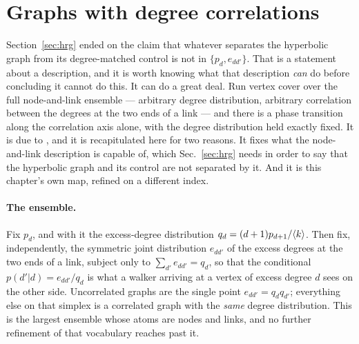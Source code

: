\section{Graphs with degree correlations}
\label{sec:vw}

Section~\ref{sec:hrg} ended on the claim that whatever separates the hyperbolic
graph from its degree-matched control is not in $\{p_{d},e_{dd'}\}$. That is a
statement about a description, and it is worth knowing what that description
\emph{can} do before concluding it cannot do this. It can do a great deal. Run
vertex cover over the full node-and-link ensemble --- arbitrary degree
distribution, arbitrary correlation between the degrees at the two ends of a
link --- and there is a phase transition along the correlation axis alone, with
the degree distribution held exactly fixed. It is due to \citet{vazquez2003vw},
and it is recapitulated here for two reasons. It fixes what the node-and-link
description is capable of, which Sec.~\ref{sec:hrg} needs in order to say that
the hyperbolic graph and its control are not separated by it. And it is this
chapter's own map, refined on a different index.

\paragraph{The ensemble.} Fix $p_{d}$, and with it the excess-degree
distribution $q_{d}=(d+1)p_{d+1}/\langle k \rangle$. Then fix, independently, the
symmetric joint distribution $e_{dd'}$ of the excess degrees at the two ends of
a link, subject only to $\sum_{d'}e_{dd'}=q_{d}$, so that the conditional
$p(d'|d)=e_{dd'}/q_{d}$ is what a walker arriving at a vertex of excess degree
$d$ sees on the other side. Uncorrelated graphs are the single point
$e_{dd'}=q_{d}q_{d'}$; everything else on that simplex is a correlated graph
with the \emph{same} degree distribution. This is the largest ensemble whose
atoms are nodes and links, and no further refinement of that vocabulary reaches
past it.


